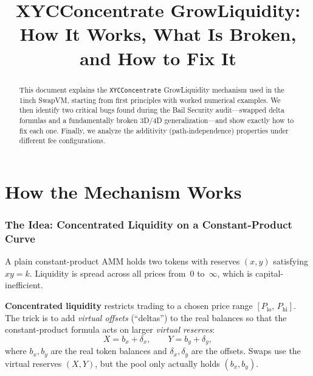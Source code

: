 \documentclass[11pt]{article}
\title{XYCConcentrate GrowLiquidity:\\
How It Works, What Is Broken, and How to Fix It}
\date{}
\theoremstyle{definition}
\begin{document}
\maketitle

\begin{abstract}
This document explains the \texttt{XYCConcentrate} GrowLiquidity mechanism
used in the 1inch SwapVM, starting from first principles with worked numerical
examples.
We then identify two critical bugs found during the Bail Security audit---swapped
delta formulas and a fundamentally broken 3D/4D generalization---and show
exactly how to fix each one.
Finally, we analyze the additivity (path-independence) properties under
different fee configurations.
\end{abstract}

\tableofcontents


\part{How the Mechanism Works}

\section{The Idea: Concentrated Liquidity on a Constant-Product Curve}

A plain constant-product AMM holds two tokens with reserves $(x, y)$ satisfying
$xy = k$.  Liquidity is spread across all prices from~$0$ to~$\infty$,
which is capital-inefficient.

\textbf{Concentrated liquidity} restricts trading to a chosen price range
$[P_{\mathrm{lo}},\, P_{\mathrm{hi}}]$.
The trick is to add \emph{virtual offsets} (``deltas'') to the real balances
so that the constant-product formula acts on larger \emph{virtual reserves}:
\[
X = b_x + \delta_x, \qquad Y = b_y + \delta_y,
\]
where $b_x, b_y$ are the real token balances and $\delta_x, \delta_y$ are the
offsets.  Swaps use the virtual reserves $(X, Y)$, but the pool only actually
holds $(b_x, b_y)$.
\end{document}
